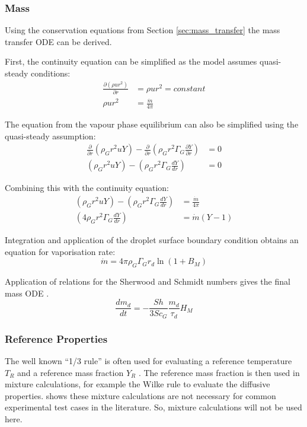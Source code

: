 \documentclass[../Interim_Report_Master]{subfiles}
\begin{document}
\subsubsection{Mass}\label{sec:mass_mod}
Using the conservation equations from Section \ref{sec:mass_transfer} the mass transfer ODE can be derived.

First, the continuity equation can be simplified as the model assumes quasi-steady conditions:
\begin{subequations}
\begin{align}
\frac{\partial(\rho u r^2)}{\partial r} &= \rho u r^2 = constant \\
\rho u r^2 &= \frac{\dot{m}}{4\pi}
\end{align}
\end{subequations}

The equation from the vapour phase equilibrium can also be simplified using the quasi-steady assumption:
\begin{subequations}
\begin{align}
\frac{\partial}{\partial r}(\rho_G r^2 u Y ) - \frac{\partial}{\partial r}(\rho_G r^2 \Gamma_G \frac{\partial Y}{\partial r}) &= 0 \\
(\rho_G r^2 u Y ) - (\rho_G r^2 \Gamma_G \frac{dY}{dr}) &= 0
\end{align}
\end{subequations}

Combining this with the continuity equation:
\begin{subequations}
\begin{align}
(\rho_G r^2 u Y ) - (\rho_G r^2 \Gamma_G \frac{dY}{dr}) &= \frac{\dot{m}}{4\pi} \\
(4 \rho_G r^2 \Gamma_G \frac{dY}{dr}) &= \dot{m}(Y-1)
\end{align}
\end{subequations}

Integration and application of the droplet surface boundary condition obtains an equation for vaporisation rate:
\begin{equation}
\dot{m} = 4\pi \rho_G \Gamma_G r_d \ln(1+B_M)
\end{equation}

Application of relations for the Sherwood and Schmidt numbers gives the final mass ODE \cite{sirignano_1999}.
\begin{equation}
\frac{dm_d}{dt} = -\frac{Sh}{3Sc_G}\frac{m_d}{\tau_d}H_M
\end{equation}

\subsubsection{Reference Properties}
The well known ``1/3 rule'' is often used for evaluating a reference temperature $T_R$ and a reference mass fraction $Y_R$ \cite{Miller1998} \cite{Shashank2011} \cite{SacomanoFilho2019} \cite{Kolaitis2006} \cite{Aggarwal1984}. The reference mass fraction is then used in mixture calculations, for example the Wilke rule to evaluate the diffusive properties. \cite{Miller1998} shows these mixture calculations are not necessary for common experimental test cases in the literature. So, mixture calculations will not be used here. 
\end{document}
